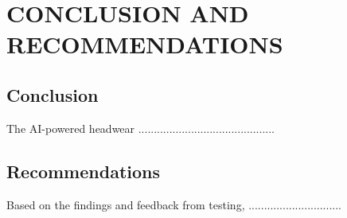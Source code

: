 \chapter{CONCLUSION AND RECOMMENDATIONS} %
\label{Chapter5} %

\section{Conclusion}
The AI-powered headwear ............................................

\section{Recommendations}
Based on the findings and feedback from testing, ..............................
